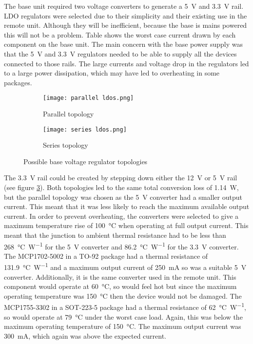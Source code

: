 The base unit required two voltage converters to generate a \SI{5}{\volt} and \SI{3.3}{\volt} rail. LDO regulators were selected due to their simplicity and their existing use in the remote unit. Although they will be inefficient, because the base is mains powered this will not be a problem. Table \label{fig: base current} shows the worst case current drawn by each component on the base unit. The main concern with the base power supply was that the \SI{5}{\volt} and \SI{3.3}{\volt} regulators needed to be able to supply all the devices connected to those rails. The large currents and voltage drop in the regulators led to a large power dissipation, which may have led to overheating in some packages.\\

\begin{figure}[htbp]
	\centering
	\begin{subfigure}[b]{0.4\linewidth}
		\texttt{[image: parallel ldos.png]}
		\caption{Parallel topology}
		\label{fig: parallel ldos}
	\end{subfigure}
	\begin{subfigure}[b]{0.4\linewidth}
		\texttt{[image: series ldos.png]}
		\caption{Series topology}
		\label{fig: series ldos}
	\end{subfigure}
	\caption{Possible base voltage regulator topologies}
	\label{fig: base ldos}
\end{figure}

The \SI{3.3}{\volt} rail could be created by stepping down either the \SI{12}{\volt} or \SI{5}{\volt} rail (see figure \ref{fig: base ldos}). Both topologies led to the same total conversion loss of \SI{1.14}{\watt}, but the parallel topology was chosen as the \SI{5}{\volt} converter had a smaller output current. This meant that it was less likely to reach the maximum available output current. In order to prevent overheating, the converters were selected to give a maximum temperature rise of \SI{100}{\celsius} when operating at full output current. This meant that the junction to ambient thermal resistance had to be less than \SI{268}{\celsius\per\watt} for the \SI{5}{\volt} converter and \SI{86.2}{\celsius\per\watt} for the \SI{3.3}{\volt} converter. The MCP1702-5002 \cite{mcp1702} in a TO-92 package had a thermal resistance of \SI{131.9}{\celsius\per\watt} and a maximum output current of \SI{250}{\milli\ampere} so was a suitable \SI{5}{\volt} converter. Additionally, it is the same converter used in the remote unit. This component would operate at \SI{60}{\celsius}, so would feel hot but since the maximum operating temperature was \SI{150}{\celsius} then the device would not be damaged. The MCP1755-3302 \cite{mcp1755} in a SOT-223-5 package had a thermal resistance of \SI{62}{\celsius\per\watt}, so would operate at \SI{79}{\celsius} under the worst case load. Again, this was below the maximum operating temperature of \SI{150}{\celsius}. The maximum output current was \SI{300}{\milli\ampere}, which again was above the expected current.\\

